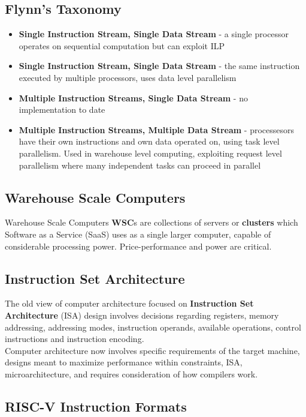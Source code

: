 \documentclass[11pt]{article}
\begin{document}
\subsection{Flynn's Taxonomy}

\begin{itemize}
    \item \textbf{Single Instruction Stream, Single Data Stream} - a single processor operates on sequential computation but can exploit ILP
    \item \textbf{Single Instruction Stream, Single Data Stream} - the same instruction executed by multiple processors, uses data level parallelism
    \item \textbf{Multiple Instruction Streams, Single Data Stream} - no implementation to date
    \item \textbf{Multiple Instruction Streams, Multiple Data Stream} - processesors have their own instructions and own data operated on, using task level parallelism. Used in warehouse level computing, exploiting request level parallelism where many independent tasks can proceed in parallel
\end{itemize}

\subsection{Warehouse Scale Computers}

Warehouse Scale Computers \textbf{WSC}s are collections of servers or \textbf{clusters} which Software as a Service (SaaS) uses as a single larger computer, capable of considerable processing power. Price-performance and power are critical.

\subsection{Instruction Set Architecture}

The old view of computer architecture focused on \textbf{Instruction Set Architecture} (ISA) design involves decisions regarding registers, memory addressing, addressing modes, instruction operands, available operations, control instructions and instruction encoding.\\

Computer architecture now involves specific requirements of the target machine, designs meant to maximize performance within constraints, ISA, microarchitecture, and requires consideration of how compilers work.

\subsection{RISC-V Instruction Formats}
\end{document}
